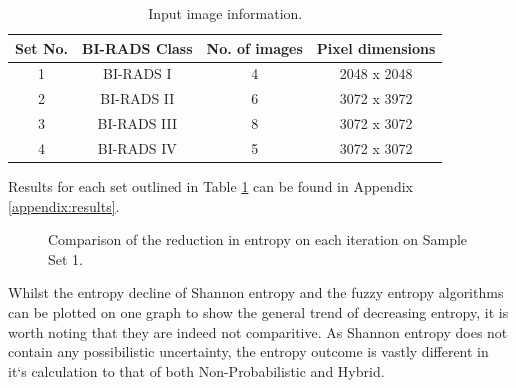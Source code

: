\begin{table}[H]
  \centering
  \begin{tabular}{|c|c|c|c|}
    \hline
      \textbf{Set No.} & \textbf{BI-RADS Class} & \textbf{No. of images} & \textbf{Pixel dimensions} \\ \hline
      1 & BI-RADS I & 4 & 2048 x 2048 \\ \hline
      2 & BI-RADS II & 6 & 3072 x 3972 \\ \hline
      3 & BI-RADS III & 8 & 3072 x 3072 \\ \hline
      4 & BI-RADS IV & 5 & 3072 x 3072 \\ \hline
  \end{tabular}
  \caption{Input image information.}
  \label{table:image-info}
\end{table}

Results for each set outlined in Table \ref{table:image-info} can be found in Appendix \ref{appendix:results}.

\begin{figure}[H]
  \begin{center}
    \caption{Comparison of the reduction in entropy on each iteration on Sample Set 1.}
    \label{fig:set1-results-all}
  \end{center}
\end{figure}

Whilst the entropy decline of Shannon entropy and the fuzzy entropy algorithms can be plotted on one graph to show the general trend of decreasing entropy, it is worth noting that they are indeed not comparitive. As Shannon entropy does not contain any possibilistic uncertainty, the entropy outcome is vastly different in it`s calculation to that of both Non-Probabilistic and Hybrid.

